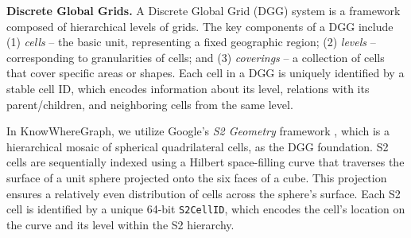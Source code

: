 \textbf{Discrete Global Grids. } A Discrete Global Grid (DGG) system is a framework composed of hierarchical levels of grids. The key components of a DGG include (1) \emph{cells} -- the basic unit, representing a fixed geographic region; (2) \emph{levels} -- corresponding to granularities of cells; and (3) \emph{coverings} -- a collection of cells that cover specific areas or shapes. Each cell in a DGG is uniquely identified by a stable cell ID, which encodes information about its level, relations with its parent/children, and neighboring cells from the same level. 

In KnowWhereGraph, we utilize Google's \emph{S2 Geometry} framework \citep{veach2017s2}, which is a hierarchical mosaic of spherical quadrilateral cells, as the DGG foundation. S2 cells are sequentially indexed using a Hilbert space-filling curve that traverses the surface of a unit sphere projected onto the six faces of a cube. This projection ensures a relatively even distribution of cells across the sphere's surface. Each S2 cell is identified by a unique 64-bit \texttt{S2CellID}, which encodes the cell’s location on the curve and its level within the S2 hierarchy. 

